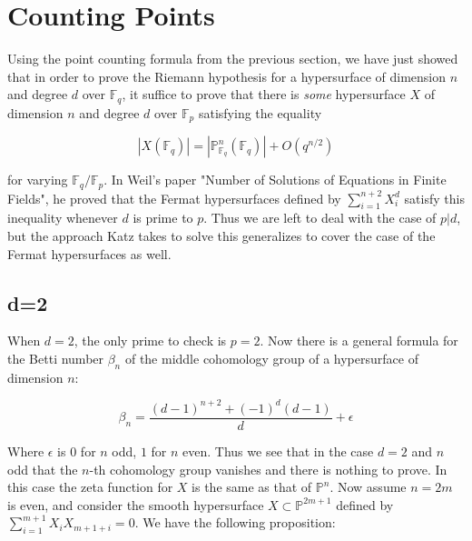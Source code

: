 \documentclass{ucbthesis}
\theoremstyle{definition}
\theoremstyle{theorem}
\begin{document}
\chapter{Counting Points}

Using the point counting formula from the previous section, we have just showed that in order to prove the Riemann hypothesis for a hypersurface of dimension $n$ and degree $d$ over $\mathbb{F}_{q}$, it suffice to prove that there is \emph{some} hypersurface $X$ of dimension $n$ and degree $d$ over $\mathbb{F}_{p}$ satisfying the equality 

$$|X(\mathbb{F}_{q})| = |\mathbb{P}_{\mathbb{F}_{q}}^{n}(\mathbb{F}_{q})| + O(q^{n/2})$$

for varying $\mathbb{F}_{q}/\mathbb{F}_{p}$. In Weil's paper "Number of Solutions of Equations in Finite Fields", he proved that the Fermat hypersurfaces defined by $\sum\limits_{i=1}^{n+2}X_{i}^{d}$ satisfy this inequality whenever $d$ is prime to $p$. Thus we are left to deal with the case of $p|d$, but the approach Katz takes to solve this generalizes to cover the case of the Fermat hypersurfaces as well.

\section{d=2}
When $d=2$, the only prime to check is $p=2$. Now there is a general formula for the Betti number $\beta_{n}$ of the middle cohomology group of a hypersurface of dimension $n$:

$$\beta_{n} = \frac{(d-1)^{n+2} + (-1)^{d}(d-1)}{d} + \epsilon$$

Where $\epsilon$ is $0$ for $n$ odd, $1$ for $n$ even. Thus we see that in the case $d=2$ and $n$ odd that the $n$-th cohomology group vanishes and there is nothing to prove. In this case the zeta function for $X$ is the same as that of $\mathbb{P}^{n}$. Now assume $n=2m$ is even, and consider the smooth hypersurface $X\subset \mathbb{P}^{2m+1}$ defined by $ \sum\limits_{i=1}^{m+1}X_{i}X_{m+1+i} = 0$. We have the following proposition:
\end{document}
